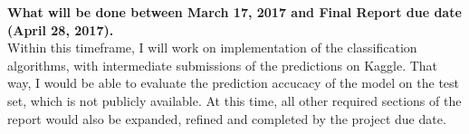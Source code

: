 \documentclass{sig-alternate-05-2015}
\begin{document}
\textbf{What will be done between March 17, 2017 and Final Report due date (April 28, 2017).} \\
Within this timeframe, I will work on implementation of the classification algorithms, with intermediate submissions of the predictions on Kaggle. That way, I would be able to evaluate the prediction accucacy of the model on the test set, which is not publicly available. At this time, all other required sections of the report would also be expanded, refined and completed by the project due date. 

%

% 

%
%





\end{document}

